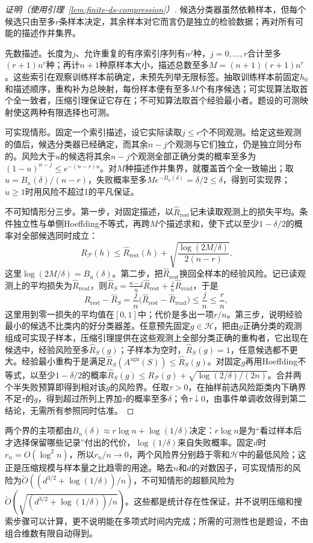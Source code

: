 \begin{proof}[证明（使用引理~\ref{lem:finite-ds-compression}）]
候选分类器虽然依赖样本，但每个候选只由至多$r$条样本决定，其余样本对它而言仍是独立的检验数据；再对所有可能的描述作并集界。

先数描述。长度为$j$、允许重复的有序索引序列有$n^j$种，$j=0,\ldots,r$合计至多$(r+1)n^r$种；再计$n+1$种原样本大小，描述总数至多$M=(n+1)(r+1)n^r$。这些索引在观察训练样本前确定，未预先列举无限标签。抽取训练样本前固定$h_0$和描述顺序，重构补为总映射，每份样本便有至多$M$个有序候选；可实现算法取首个全一致者，压缩引理保证它存在；不可知算法取首个经验最小者。题设的可测映射使这两种有限选择也可测。

可实现情形。固定一个索引描述，设它实际读取$j\leq r$个不同观测。给定这些观测的值后，候选分类器已经确定，而其余$n-j$个观测与它们独立，仍是独立同分布的。风险大于$u$的候选将其余$n-j$个观测全部正确分类的概率至多为$(1-u)^{n-j}\leq e^{-(n-r)u}$。对$M$种描述作并集界，就覆盖首个全一致输出；取$u=B_n(\delta)/(n-r)$，失败概率至多$Me^{-B_n(\delta)}=\delta/2\leq\delta$，得到可实现界；$u\geq1$时用风险不超过1的平凡保证。

不可知情形分三步。第一步，对固定描述，以$\hat R_{\mathrm{rest}}$记未读取观测上的损失平均。条件独立性与单侧Hoeffding不等式，再跨$M$个描述求和，使下式以至少$1-\delta/2$的概率对全部候选同时成立：
\[
 R_{\mathcal P}(h)\leq\hat R_{\mathrm{rest}}(h)+\sqrt{\frac{\log(2M/\delta)}{2(n-r)}}.
\]
这里$\log(2M/\delta)=B_n(\delta)$。第二步，把$\hat R_{\mathrm{rest}}$换回全样本的经验风险。记已读观测上的平均损失为$\hat R_{\mathrm{read}}$，则$\hat R_S=\frac{n-j}n\hat R_{\mathrm{rest}}+\frac jn\hat R_{\mathrm{read}}$，于是
\[
 \hat R_{\mathrm{rest}}-\hat R_S=\frac jn\bigl(\hat R_{\mathrm{rest}}-\hat R_{\mathrm{read}}\bigr)\leq\frac jn\leq\frac rn,
\]
这里用到零一损失的平均值在$[0,1]$中；代价是多出一项$r/n$。第三步，说明经验最小的候选不比类内的好分类器差。任意预先固定$g\in\mathcal H$，把由$g$正确分类的观测组成可实现子样本，压缩引理提供在这些观测上全部分类正确的重构者，它出现在候选中，经验风险至多$\hat R_S(g)$；子样本为空时，$\hat R_S(g)=1$，任意候选都不更大。经验最小重构于是满足$\hat R_S(A^{\mathrm{agn}}(S))\leq\hat R_S(g)$。对固定$g$再用Hoeffding不等式，以至少$1-\delta/2$的概率$\hat R_S(g)\leq R_{\mathcal P}(g)+\sqrt{\log(2/\delta)/(2n)}$。合并两个半失败预算即得到相对该$g$的风险界。任取$\tau>0$，在抽样前选风险距类内下确界不足$\tau$的$g$，得到超过所列上界加$\tau$的概率至多$\delta$；令$\tau\downarrow0$，由事件单调收敛得到第二结论，无需所有参照同时估准。
\end{proof}

两个界的主项都由$B_n(\delta)\approx r\log n+\log(1/\delta)$决定：$r\log n$是为“看过样本后才选择保留哪些记录”付出的代价，$\log(1/\delta)$来自失败概率。固定$d$时$r_n=O(\log^2n)$，所以$r_n/n\to0$，两个风险界分别趋于零和$\mathcal H$中的最低风险；这正是压缩规模与样本量之比趋零的用途。略去$n$和$d$的对数因子，可实现情形的风险为$\widetilde O((d^{3/2}+\log(1/\delta))/n)$，不可知情形的超额风险为$\widetilde O(\sqrt{(d^{3/2}+\log(1/\delta))/n})$。这些都是统计存在性保证，并不说明压缩和搜索步骤可以计算，更不说明能在多项式时间内完成；所需的可测性也是题设，不由组合维数有限自动得到。
